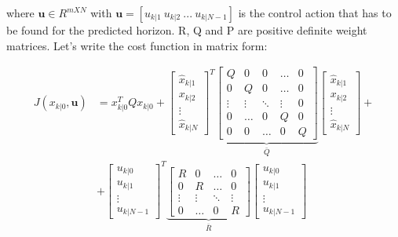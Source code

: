 where $\textbf{u} \in R^{mXN}$ with $\textbf{u} = [u_{k|1}\ u_{k|2}\ ...\ u_{k|N-1}]$ is the control action that has to be found for the predicted horizon. R, Q and P are positive definite weight matrices. Let's write the cost function in matrix form: 

\begin{equation*}
\begin{split}
		J(x_{k|0},\textbf{u})&=x_{k|0}^T Q x_{k|0} + 
		\left[ \begin{matrix} \hat{x}_{k|1} \\ x_{k|2} \\ \vdots \\ \hat{x}_{k|N} 		\end{matrix} \right]^T \underbrace{\left[ \begin{matrix} 
Q	 		&		 0	  	&  	0	  &  \dots  &  0 \\ 
0 			&  	 Q 	  	& 		0 	  &  \dots  &  0 \\
\vdots  	& 	  \vdots  	&   \ddots   &  \vdots &  0 \\
0 			& 	  \dots  	&      0     &      Q  &  0 \\
0			& 		 0 		&	  \dots   &      0  &  Q
\end{matrix} \right]}_{\bar{Q}}
\left[ \begin{matrix} \hat{x}_{k|1} \\ x_{k|2} \\ \vdots \\ \hat{x}_{k|N} \end{matrix} \right] +  \\ 
&+\left[ \begin{matrix} u_{k|0} \\ u_{k|1} \\ \vdots \\ u_{k|N-1} 		\end{matrix} \right]^T \underbrace{\left[ \begin{matrix} 
R	 		&		 0	  	&     \dots   &  0 \\ 
0 			&  	     R 	  	&     \dots	  &  0 \\
\vdots  	& 	  \vdots  	&    \ddots   &  \vdots \\
0			& 	  \dots     &        0    &  R
\end{matrix} \right]}_{\bar{R}}
\left[ \begin{matrix} u_{k|0} \\ u_{k|1} \\ \vdots \\ u_{k|N-1}  \end{matrix} \right] 
\end{split}
\end{equation*}

